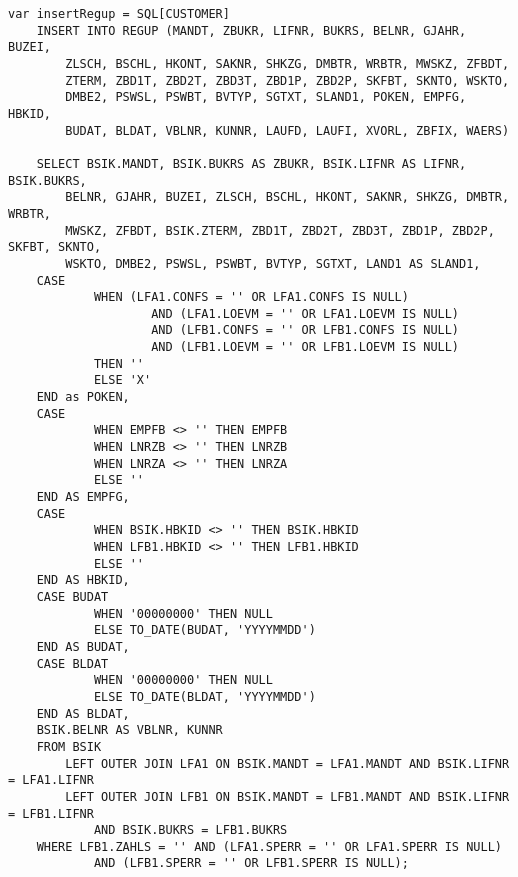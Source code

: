 \clearpage
\begin{lstlisting}[caption={Allgemeiner Teil des SQL-Statements für Belegpositionen}, label={lst:regupgeneral}, language=JavaScriptSQL2, basicstyle=\ttfamily\scriptsize]
var insertRegup = SQL[CUSTOMER]
    INSERT INTO REGUP (MANDT, ZBUKR, LIFNR, BUKRS, BELNR, GJAHR, BUZEI,
		ZLSCH, BSCHL, HKONT, SAKNR, SHKZG, DMBTR, WRBTR, MWSKZ, ZFBDT,
		ZTERM, ZBD1T, ZBD2T, ZBD3T, ZBD1P, ZBD2P, SKFBT, SKNTO, WSKTO,
		DMBE2, PSWSL, PSWBT, BVTYP, SGTXT, SLAND1, POKEN, EMPFG, HBKID,
		BUDAT, BLDAT, VBLNR, KUNNR, LAUFD, LAUFI, XVORL, ZBFIX, WAERS)

    SELECT BSIK.MANDT, BSIK.BUKRS AS ZBUKR, BSIK.LIFNR AS LIFNR, BSIK.BUKRS,
		BELNR, GJAHR, BUZEI, ZLSCH, BSCHL, HKONT, SAKNR, SHKZG, DMBTR, WRBTR,
		MWSKZ, ZFBDT, BSIK.ZTERM, ZBD1T, ZBD2T, ZBD3T, ZBD1P, ZBD2P, SKFBT, SKNTO,
		WSKTO, DMBE2, PSWSL, PSWBT, BVTYP, SGTXT, LAND1 AS SLAND1,
    CASE
			WHEN (LFA1.CONFS = '' OR LFA1.CONFS IS NULL)
					AND (LFA1.LOEVM = '' OR LFA1.LOEVM IS NULL)
					AND (LFB1.CONFS = '' OR LFB1.CONFS IS NULL)
					AND (LFB1.LOEVM = '' OR LFB1.LOEVM IS NULL)
			THEN ''
			ELSE 'X'
    END as POKEN,
    CASE
			WHEN EMPFB <> '' THEN EMPFB
			WHEN LNRZB <> '' THEN LNRZB
			WHEN LNRZA <> '' THEN LNRZA
			ELSE ''
    END AS EMPFG,
    CASE
			WHEN BSIK.HBKID <> '' THEN BSIK.HBKID
			WHEN LFB1.HBKID <> '' THEN LFB1.HBKID
			ELSE ''
    END AS HBKID,
    CASE BUDAT
			WHEN '00000000' THEN NULL
			ELSE TO_DATE(BUDAT, 'YYYYMMDD')
    END AS BUDAT,
    CASE BLDAT
			WHEN '00000000' THEN NULL
			ELSE TO_DATE(BLDAT, 'YYYYMMDD')
    END AS BLDAT,
    BSIK.BELNR AS VBLNR, KUNNR
    FROM BSIK
		LEFT OUTER JOIN LFA1 ON BSIK.MANDT = LFA1.MANDT AND BSIK.LIFNR = LFA1.LIFNR
		LEFT OUTER JOIN LFB1 ON BSIK.MANDT = LFB1.MANDT AND BSIK.LIFNR = LFB1.LIFNR
			AND BSIK.BUKRS = LFB1.BUKRS
    WHERE LFB1.ZAHLS = '' AND (LFA1.SPERR = '' OR LFA1.SPERR IS NULL)
			AND (LFB1.SPERR = '' OR LFB1.SPERR IS NULL);
\end{lstlisting}

